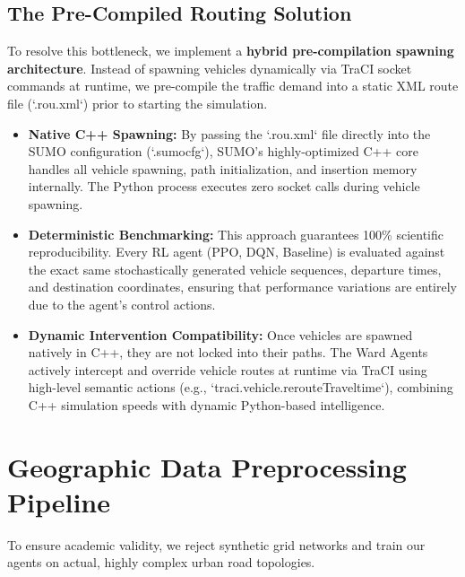 \documentclass[conference]{IEEEtran}
\begin{document}
\subsection{The Pre-Compiled Routing Solution}
To resolve this bottleneck, we implement a \textbf{hybrid pre-compilation spawning architecture}. Instead of spawning vehicles dynamically via TraCI socket commands at runtime, we pre-compile the traffic demand into a static XML route file (`.rou.xml`) prior to starting the simulation.
\begin{itemize}
    \item \textbf{Native C++ Spawning:} By passing the `.rou.xml` file directly into the SUMO configuration (`.sumocfg`), SUMO's highly-optimized C++ core handles all vehicle spawning, path initialization, and insertion memory internally. The Python process executes zero socket calls during vehicle spawning.
    \item \textbf{Deterministic Benchmarking:} This approach guarantees 100\% scientific reproducibility. Every RL agent (PPO, DQN, Baseline) is evaluated against the exact same stochastically generated vehicle sequences, departure times, and destination coordinates, ensuring that performance variations are entirely due to the agent's control actions.
    \item \textbf{Dynamic Intervention Compatibility:} Once vehicles are spawned natively in C++, they are not locked into their paths. The Ward Agents actively intercept and override vehicle routes at runtime via TraCI using high-level semantic actions (e.g., `traci.vehicle.rerouteTraveltime`), combining C++ simulation speeds with dynamic Python-based intelligence.
\end{itemize}

\section{Geographic Data Preprocessing Pipeline}
To ensure academic validity, we reject synthetic grid networks and train our agents on actual, highly complex urban road topologies.
\end{document}
